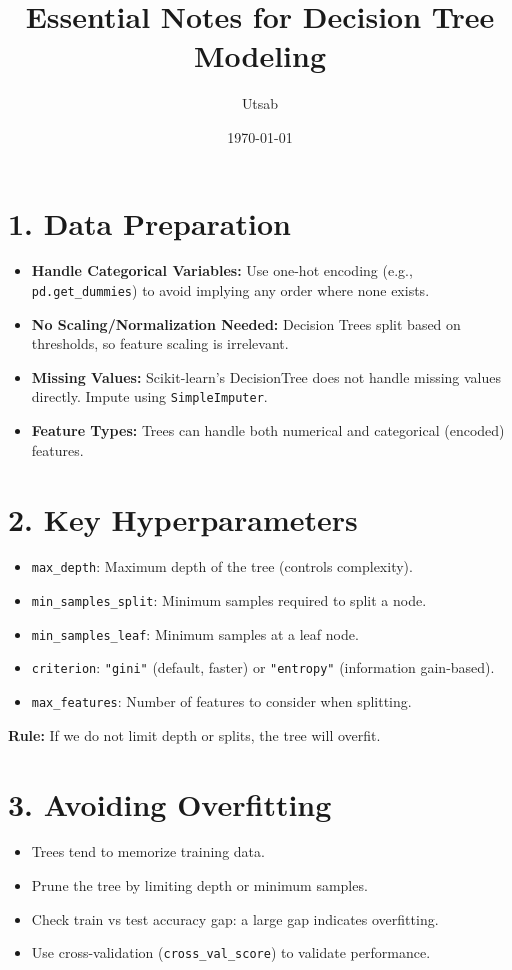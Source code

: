 \documentclass[11pt,a4paper]{article}
\title{\textbf{Essential Notes for Decision Tree Modeling}}
\author{Utsab}
\date{\today}
\begin{document}
\maketitle

\section*{1. Data Preparation}
\begin{itemize}[leftmargin=1.5em]
    \item \textbf{Handle Categorical Variables:} Use one-hot encoding (e.g., \texttt{pd.get\_dummies}) to avoid implying any order where none exists.
    \item \textbf{No Scaling/Normalization Needed:} Decision Trees split based on thresholds, so feature scaling is irrelevant.
    \item \textbf{Missing Values:} Scikit-learn's DecisionTree does not handle missing values directly. Impute using \texttt{SimpleImputer}.
    \item \textbf{Feature Types:} Trees can handle both numerical and categorical (encoded) features.
\end{itemize}

\section*{2. Key Hyperparameters}
\begin{itemize}[leftmargin=1.5em]
    \item \texttt{max\_depth}: Maximum depth of the tree (controls complexity).
    \item \texttt{min\_samples\_split}: Minimum samples required to split a node.
    \item \texttt{min\_samples\_leaf}: Minimum samples at a leaf node.
    \item \texttt{criterion}: \texttt{"gini"} (default, faster) or \texttt{"entropy"} (information gain-based).
    \item \texttt{max\_features}: Number of features to consider when splitting.
\end{itemize}

\textbf{Rule:} If we do not limit depth or splits, the tree will overfit.

\section*{3. Avoiding Overfitting}
\begin{itemize}[leftmargin=1.5em]
    \item Trees tend to memorize training data.
    \item Prune the tree by limiting depth or minimum samples.
    \item Check train vs test accuracy gap: a large gap indicates overfitting.
    \item Use cross-validation (\texttt{cross\_val\_score}) to validate performance.
\end{itemize}
\end{document}
